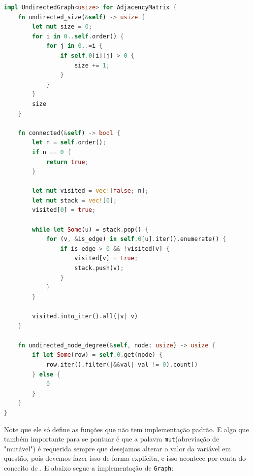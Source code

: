 \begin{lstlisting}[language=Rust, caption={Implementação de UndirectedGraph na Estrutura de Dados Matriz de Adjacência}, label=list:impl_adj_mat_ug] impl UndirectedGraph<usize> for AdjacencyMatrix {
    fn undirected_size(&self) -> usize {
        let mut size = 0;
        for i in 0..self.order() {
            for j in 0..=i {
                if self.0[i][j] > 0 {
                    size += 1;
                }
            }
        }
        size
    }

    fn connected(&self) -> bool {
        let n = self.order();
        if n == 0 {
            return true;
        }

        let mut visited = vec![false; n];
        let mut stack = vec![0];
        visited[0] = true;

        while let Some(u) = stack.pop() {
            for (v, &is_edge) in self.0[u].iter().enumerate() {
                if is_edge > 0 && !visited[v] {
                    visited[v] = true;
                    stack.push(v);
                }
            }
        }

        visited.into_iter().all(|v| v)
    }

    fn undirected_node_degree(&self, node: usize) -> usize {
        if let Some(row) = self.0.get(node) {
            row.iter().filter(|&&val| val != 0).count()
        } else {
            0
        }
    }
}
\end{lstlisting}

Note que ele só define as funções que não tem implementação padrão. E algo que também importante para se pontuar é que a palavra \texttt{mut}(abreviação de "mutável") é requerida sempre que desejamos alterar o valor da variável em questão, pois devemos fazer isso de forma explícita, e isso acontece por conta do conceito de \cite{ownership}. E abaixo segue a implementação de \texttt{Graph}:

